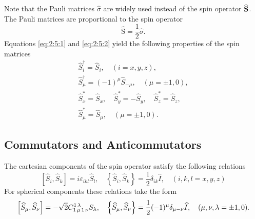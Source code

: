 Note that the Pauli matrices $\hat{\sigma}$ are widely used instead of the spin operator $\widehat{\mathbf{S}}$. The Pauli matrices are proportional to the spin operator
\begin{equation}
\widehat{\mathrm{S}}=\frac{1}{2} \widehat{\sigma}. \label{eq:2:5:4}
\end{equation}
Equations \eqref{eq:2:5:1} and \eqref{eq:2:5:2} yield the following properties of the spin matrices
\begin{gather}
\widehat{S}_{i}^{\dagger}=\widehat{S}_{i}, \quad(i=x, y, z),  \label{eq:2:5:5}\\
\widehat{S}_{\mu}^{\dagger}=(-1)^{\mu} \widehat{S}_{-\mu}, \quad(\mu= \pm 1,0),  \label{eq:2:5:6}\\
\widehat{S}_{x}^{*}=\widehat{S}_{x}, \quad \widehat{S}_{y}^{*}=-\widehat{S}_{y}, \quad \widehat{S}_{z}^{*}=\widehat{S}_{z},  \label{eq:2:5:7}\\
\widehat{S}_{\mu}^{*}=\widehat{S}_{\mu}, \quad(\mu= \pm 1,0) . \label{eq:2:5:8}
\end{gather}
\subsection{Commutators and Anticommutators}
The cartesian components of the spin operator satisfy the following relations
\begin{equation}
\left[\widehat{S}_{i}, \widehat{S}_{k}\right]=i \varepsilon_{i k l} \widehat{S}_{l}, \quad\left\{\widehat{S}_{i}, \widehat{S}_{k}\right\}=\frac{1}{2} \delta_{i k} \widehat{I}, \quad(i, k, l=x, y, z) \label{eq:2:5:9}
\end{equation}
For spherical components these relations take the form
\begin{equation}
\left[\widehat{S}_{\mu}, \widehat{S}_{\nu}\right]=-\sqrt{2} C_{1\,\mu\,1\,\nu}^{1\,\lambda} S_{\lambda}, \quad\left\{\widehat{S}_{\mu}, \widehat{S}_{\nu}\right\}=\frac{1}{2}(-1)^{\mu} \delta_{\mu-\nu} \widehat{I}, \quad(\mu, \nu, \lambda= \pm 1,0). \label{eq:2:5:10}
\end{equation}

